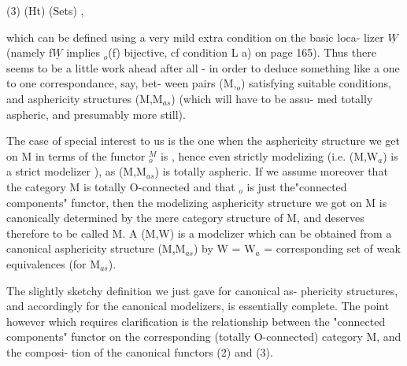 
(3) \qquad (Ht)  (Sets) ,

which can be defined using a very mild extra condition on the basic loca-%
lizer $\underline{W}$ (namely f\hand{$\in$}$\underline{W}$ implies \hand{$\pi$}$_{o}$(f) bijective, cf condition L a) on
page 165). Thus there seems to be a little work ahead after all -
in order to deduce something like a one to one correspondance, say, bet-%
ween  pairs (M,\hand{$\pi$}$_{o}$) satisfying suitable conditions, and
 asphericity structures  (M,M$_{as}$)
 (which will have to be assu-%
med totally aspheric, and presumably  more still).

The case of special interest to us is the one when the asphericity
structure we get on M in terms of the functor \hand{$\pi$}$^{M}_{o}$ is \hand{\uline{\textcolor{black}{modelizing}}}, hence
even strictly modelizing (i.e. (M,W$_{a}$) is a strict modelizer ), as
(M,M$_{as}$) is totally aspheric. If we assume moreover that 
the category M is totally O-connected and that \hand{$\pi$}$_{o}$ is just the"connected
components" functor, then the modelizing asphericity structure we got
on M is canonically determined by the mere category structure of M,
and deserves therefore to be called  \hand{\uline{\textcolor{black}{canonical}}}  \hand{\uline{\textcolor{black}{asphericity structure}}}
\hand{\uline{\textcolor{black}{on}}} M. A \hand{\uline{\textcolor{black}{canonical}}} \hand{\uline{\textcolor{black}{modelizer}}} (M,W) is a modelizer which can be obtained
from a canonical asphericity structure (M,M$_{as}$) by W = W$_{a}$ = corresponding
set of weak equivalences (for M$_{as}$).

\hand{\uline{\textcolor{black}{Remark}}} The slightly sketchy definition we just gave for  canonical  as-%
phericity structures, and accordingly for the canonical modelizers, is
essentially complete. The point however which requires clarification is
the relationship between the  "connected components" functor
on the corresponding (totally O-connected) category M, and the composi-%
tion of the canonical functors (2) and (3).

